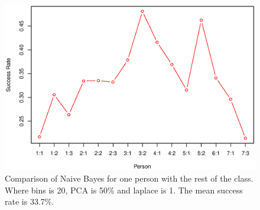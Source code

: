 \begin{figure}[H]
\centering
\includegraphics[width = \textwidth]{graphics/graph_baye_comparison}
\caption{Comparison of Naive Bayes for one person with the rest of the class.
Where bins is 20, PCA is 50\% and laplace is 1. The mean success rate is 33.7\%.}
\label{fig:comp_naiveBayes}
\end{figure}







